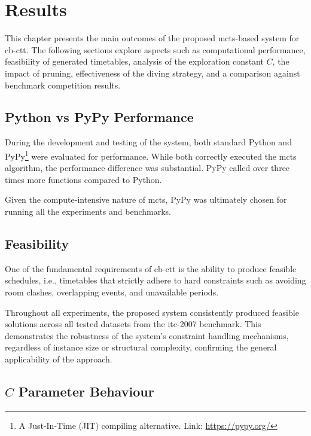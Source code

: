 \chapter{Results}

\label{Results}

This chapter presents the main outcomes of the proposed \ac{mcts}-based system for \ac{cb-ctt}. The following sections explore aspects such as computational performance, feasibility of generated timetables, analysis of the exploration constant \(C\), the impact of pruning, effectiveness of the diving strategy, and a comparison against benchmark competition results.

\section{Python vs PyPy Performance}

During the development and testing of the system, both standard Python and PyPy\footnote{A Just-In-Time (JIT) compiling alternative. Link: \url{https://pypy.org/}} were evaluated for performance. While both correctly executed the \ac{mcts} algorithm, the performance difference was substantial. PyPy called over three times more functions compared to Python.

Given the compute-intensive nature of \ac{mcts}, PyPy was ultimately chosen for running all the experiments and benchmarks.

\section{Feasibility}

One of the fundamental requirements of \ac{cb-ctt} is the ability to produce feasible schedules, i.e., timetables that strictly adhere to hard constraints such as avoiding room clashes, overlapping events, and unavailable periods.

Throughout all experiments, the proposed system consistently produced feasible solutions across all tested datasets from the \ac{itc-2007} benchmark. This demonstrates the robustness of the system's constraint handling mechanisms, regardless of instance size or structural complexity, confirming the general applicability of the approach.

\section{\(C\) Parameter Behaviour}

